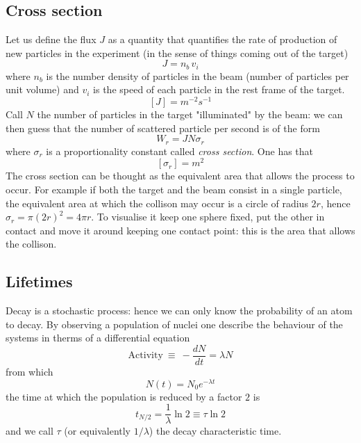 \subsection*{Cross section}
Let us define the flux $J$ as a quantity that quantifies the rate of production of new particles
in the experiment (in the sense of things coming out of the target)
\begin{equation*}
    J = n_b \, v_i
\end{equation*}
where $n_b$ is the number density of particles in the beam (number of particles per unit volume) and 
$v_i$ is the speed of each particle in the rest frame of the target.
\begin{equation*}
    \left[J\right] = m^{-2}s^{-1}
\end{equation*}
Call $N$ the number of particles in the target "illuminated" by the beam: we can then guess that
the number of scattered particle per second is of the form
\begin{equation*}
    W_r = J N \sigma_r
\end{equation*}
where $\sigma_r$ is a proportionality constant called \emph{cross section}. One has that 
\begin{equation*}
    \left[\sigma_r\right] = m^2
\end{equation*}
The cross section can be thought as the equivalent area that allows the process to occur. 
For example if both the target and the beam consist in a single particle, the equivalent area
at which the collison may occur is a circle of radius $2r$, hence $\sigma_r = \pi\left(2r\right)^2 
= 4\pi r$. To visualise it keep one sphere fixed, put the other
in contact and move it around keeping one contact point: this is the area that allows the collison.

\subsection*{Lifetimes}
Decay is a stochastic process: hence we can only know the probability of an atom to decay.
By observing a population of nuclei one describe the behaviour of the systems in therms of a
differential equation
\begin{equation*}
    \text{Activity} \ \equiv \ -\frac{dN}{dt} = \lambda N
\end{equation*}
from which
\begin{equation*}
    N(t) = N_0 e^{-\lambda t}
\end{equation*}
the time at which the population is reduced by a factor $2$ is 
$$t_{N/2} = \frac{1}{\lambda} \ln 2 \equiv \tau \ln 2$$
and we call $\tau$ (or equivalently $1/\lambda$) the decay characteristic time.

